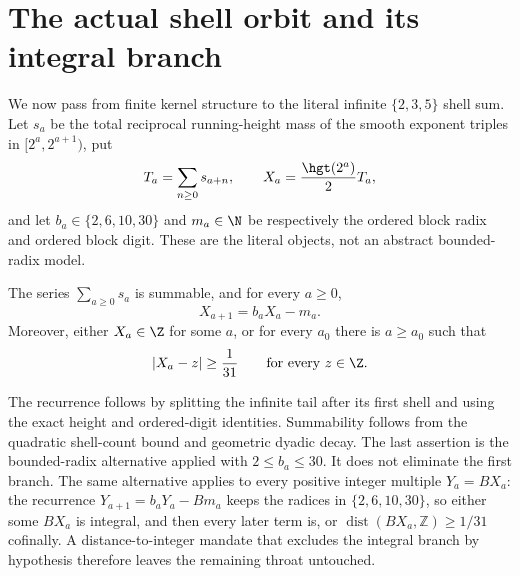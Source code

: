 
\section{The actual shell orbit and its integral branch}\label{sec:actual-orbit}

We now pass from finite kernel structure to the literal infinite
$\{2,3,5\}$ shell sum.  Let $s_a$ be the total reciprocal running-height mass
of the smooth exponent triples in $[2^a,2^{a+1})$, put
\[
 T_a=\sum_{n\ge0}s_{a+n},\qquad
 X_a=\frac{\hgt(2^a)}2T_a,
\]
and let $b_a\in\{2,6,10,30\}$ and $m_a\in\N$ be respectively the ordered
block radix and ordered block digit.  These are the literal objects, not an
abstract bounded-radix model.

\begin{theorem}\label{res:actual-orbit}
The series $\sum_{a\ge0}s_a$ is summable, and for every $a\ge0$,
\[
 X_{a+1}=b_aX_a-m_a.
\]
Moreover, either $X_a\in\Z$ for some $a$, or for every $a_0$ there is
$a\ge a_0$ such that
\[
 |X_a-z|\ge\frac1{31}\qquad\hbox{for every }z\in\Z.
\]
\end{theorem}

The recurrence follows by splitting the infinite tail after its first shell
and using the exact height and ordered-digit identities.  Summability follows
from the quadratic shell-count bound and geometric dyadic decay.  The last
assertion is the bounded-radix alternative applied with $2\le b_a\le30$.
It does not eliminate the first branch.  The same alternative applies to
every positive integer multiple $Y_a=BX_a$: the recurrence
$Y_{a+1}=b_aY_a-Bm_a$ keeps the radices in $\{2,6,10,30\}$, so either some
$BX_a$ is integral, and then every later term is, or
$\operatorname{dist}(BX_a,\mathbb Z)\ge 1/31$ cofinally.  A
distance-to-integer mandate that excludes the integral branch by hypothesis
therefore leaves the remaining throat untouched.

